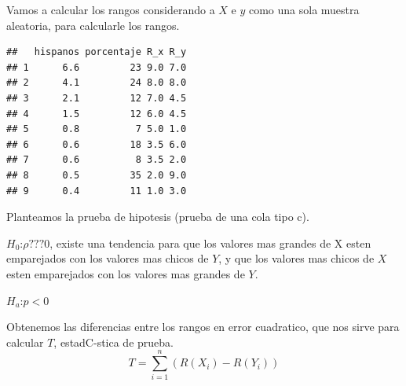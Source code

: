 \documentclass[
]{article}
\newenvironment{Shaded}{\begin{snugshade}}{\end{snugshade}}
\newcommand{\DecValTok}[1]{\textcolor[rgb]{0.00,0.00,0.81}{#1}}
\newcommand{\FunctionTok}[1]{\textcolor[rgb]{0.00,0.00,0.00}{#1}}
\newcommand{\NormalTok}[1]{#1}
\newcommand{\OtherTok}[1]{\textcolor[rgb]{0.56,0.35,0.01}{#1}}
\newcommand{\SpecialCharTok}[1]{\textcolor[rgb]{0.00,0.00,0.00}{#1}}
\begin{document}
Vamos a calcular los rangos considerando a \(X\) e \(y\) como una sola
muestra aleatoria, para calcularle los rangos.

\begin{Shaded}
\end{Shaded}

\begin{verbatim}
##   hispanos porcentaje R_x R_y
## 1      6.6         23 9.0 7.0
## 2      4.1         24 8.0 8.0
## 3      2.1         12 7.0 4.5
## 4      1.5         12 6.0 4.5
## 5      0.8          7 5.0 1.0
## 6      0.6         18 3.5 6.0
## 7      0.6          8 3.5 2.0
## 8      0.5         35 2.0 9.0
## 9      0.4         11 1.0 3.0
\end{verbatim}

Planteamos la prueba de hipotesis (prueba de una cola tipo c).

\(H_{0}\):\(\rho ??? 0\), existe una tendencia para que los valores mas
grandes de X esten emparejados con los valores mas chicos de \(Y\), y
que los valores mas chicos de \(X\) esten emparejados con los valores
mas grandes de \(Y\).

\(H_{a}\):\(p<0\)

Obtenemos las diferencias entre los rangos en error cuadratico, que nos
sirve para calcular \(T\), estadC-stica de prueba.
\[T= \sum_{i=1}^{n} (R(X_{i}) - R(Y_{i})    ) \]

\begin{Shaded}
\end{Shaded}
\end{document}
